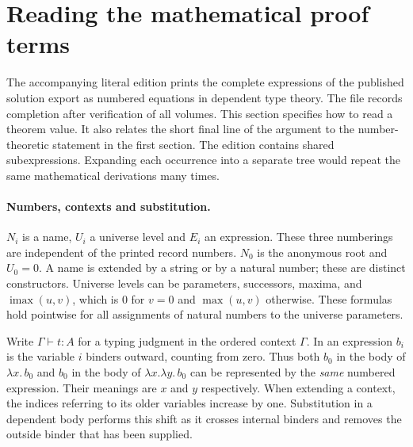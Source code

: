 \section{Reading the mathematical proof terms}
\label{sec:kernel-reading}
The accompanying literal edition prints the complete expressions of the
published solution export as numbered equations in dependent type theory.
The file  records completion after verification of all
volumes. This section specifies how to read a theorem value. It also relates the
short final line of the argument to the number-theoretic statement in the
first section. The edition contains shared subexpressions. Expanding each
occurrence into a separate tree would repeat the same mathematical
derivations many times.

\paragraph{Numbers, contexts and substitution.}
\(N_i\) is a name, \(U_i\) a universe level and \(E_i\) an expression.
These three numberings are independent of the printed record numbers.
\(N_0\) is the anonymous root and \(U_0=0\). A name is extended by
a string or by a natural number; these are distinct constructors.
Universe levels can be parameters, successors, maxima, and
\(\operatorname{imax}(u,v)\), which is \(0\) for \(v=0\) and
\(\max(u,v)\) otherwise. These formulas hold pointwise for all
assignments of natural numbers to the universe parameters.

Write \(\Gamma\vdash t:A\) for a typing judgment in the ordered context
\(\Gamma\). In an expression \(b_i\) is the variable \(i\) binders
outward, counting from zero. Thus both \(b_0\) in the body of
\(\lambda x.\,b_0\) and \(b_0\) in the body of
\(\lambda x.\lambda y.\,b_0\) can be represented by the
\emph{same} numbered expression. Their meanings are \(x\) and \(y\)
respectively. When extending a context, the indices referring to its older
variables increase by one. Substitution in a dependent body performs this
shift as it crosses internal binders and removes the outside binder that
has been supplied.

